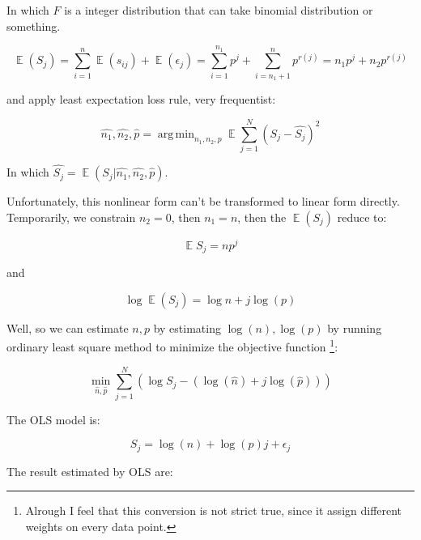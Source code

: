 \documentclass{article}
\DeclareMathOperator*{\argmin}{arg\,min}
\DeclareMathOperator{\E}{\mathbb{E}}
\begin{document}
In which $F$ is a integer distribution that can take binomial distribution or something.

\[
\E(S_j) = \sum_{i=1}^n \E(s_{ij}) + \E(\epsilon_j) = \sum_{i=1}^{n_1} p^j + \sum_{i=n_1+1}^n p^{r(j)}
= n_1 p^j + n_2 p^{r(j)}
\]

and apply least expectation loss rule, very frequentist:

\[
\hat{n_1},\hat{n_2},\hat{p} = \argmin_{n_1,n_2,p} \E\sum_{j=1}^N (S_j - \hat{S_j})^2
\]

In which $\hat{S_j} = \E(S_j | \hat{n_1},\hat{n_2},\hat{p})$.

Unfortunately, this nonlinear form can't be transformed to linear form directly. Temporarily, 
we constrain $n_2 = 0$, then $n_1 = n$, then the $\E(S_j)$ reduce to:

\[
\E{S_j} = n p^j
\]

and

\[
\log \E(S_j) = \log n + j \log(p)
\]

Well, so we can estimate $n,p$ by estimating $\log(n),\log(p)$ by running ordinary least square method to 
minimize the objective function \footnote{Alrough I feel that this conversion is not strict true, since
it assign different weights on every data point.}: 

\[
\min_{\hat{n},\hat{p}} \sum_{j=1}^N ( \log{S_j} - (\log(\hat{n}) + j \log(\hat{p})) )
\]

The OLS model is:

\[
S_j = \log(n) + \log(p) j + \epsilon_j
\]

The result estimated by OLS are:
\end{document}
